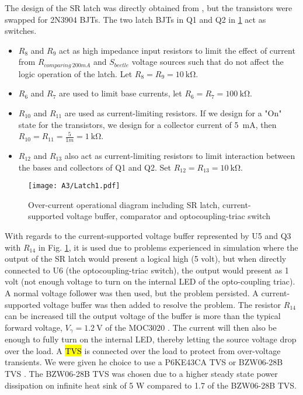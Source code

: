 The design of the SR latch was directly obtained from \cite{SR_Latch}, but the transistors were swapped for 2N3904 BJTs. The two latch BJTs in Q1 and Q2 in \ref{fig:Latch_OC} act as switches.

\begin{itemize}
    \item $R_8$ and $R_9$ act as high impedance input resistors to limit the effect of current from $R_{comparing \ 200mA}$ and $S_{beetle}$ voltage sources such that do not affect the logic operation of the latch. Let $R_8=R_9=\SI{10}{\kilo \ohm}$.
    \item $R_6$ and $R_7$ are used to limit base currents, let $R_6=R_7=\SI{100}{\kilo \ohm}$.
    \item $R_{10}$ and $R_{11}$ are used as current-limiting resistors. If we design for a "On" state for the transistors, we design for a collector current of \SI{5}{\milli \ampere}, then $R_{10}=R_{11}=\frac{5}{1m}=\SI{1}{\kilo \ohm}$.
    \item $R_{12}$ and $R_{13}$ also act as current-limiting resistors to limit interaction between the bases and collectors of Q1 and Q2.
    Set $R_{12}=R_{13}=\SI{10}{\kilo \ohm}$.
\end{itemize}

\begin{figure}[H]
    \centering
    \texttt{[image: A3/Latch1.pdf]}
    \caption{Over-current operational diagram including SR latch, current-supported voltage buffer, comparator and optocoupling-triac switch}
    \label{fig:Latch_OC}
\end{figure}


With regards to the current-supported voltage buffer represented by U5 and Q3 with $R_{14}$ in Fig. \ref{fig:Latch_OC}, it is used due to problems experienced in simulation where the output of the SR latch would present a logical high (5 volt), but when directly connected to U6 (the optocoupling-triac switch), the output would present as 1 volt (not enough voltage to turn on the internal LED of the opto-coupling triac). A normal voltage follower was then used, but the problem persisted. A  current-supported voltage buffer was then added to resolve the problem. The resistor $R_{14}$ can be increased till the output voltage of the buffer is more than the typical forward voltage, $V_{\gamma}=\SI{1.2}{\volt}$ of the MOC3020 \cite{MOC_opto}. The current will then also be enough to fully turn on the internal LED, thereby letting the source voltage drop over the load. A \hl{TVS} is connected over the load to protect from over-voltage transients. We were given he choice to use a P6KE43CA TVS \cite{P6KE} or BZW06-28B TVS \cite{BZW06}. The BZW06-28B TVS was chosen due to a higher steady state power dissipation on infinite heat sink of 5 W compared to 1.7 of the BZW06-28B TVS.

